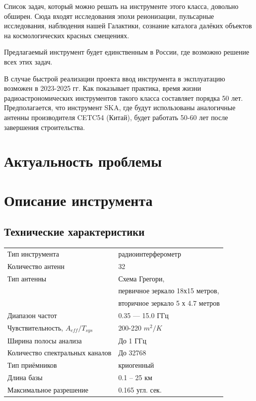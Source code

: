 \documentclass[10pt,a4paper]{article}
\begin{document}
Список задач, который можно решать на инструменте этого класса, довольно обширен. Сюда входят исследования эпохи реионизации, пульсарные исследования, наблюдения нашей Галактики, сознание каталога далёких объектов на космологических красных смещениях.

Предлагаемый инструмент будет единственным в России, где возможно решение всех этих задач.

В случае быстрой реализации проекта ввод инструмента в эксплуатацию возможен в 2023-2025 гг. Как показывает практика, время жизни радиоастрономических инструментов такого класса составляет порядка 50 лет. Предполагается, что инструмент SKA, где будут использованы аналогичные антенны производителя CETC54 (Китай), будет работать 50-60 лет после завершения строительства.

\section{Актуальность проблемы}

\section{Описание инструмента}

\subsection{ Технические характеристики}

\begin{minipage}{\linewidth}
\bigskip
\centering
{} \label{tab:rif32} 
\begin{tabular}{l|l}
  \hline
  Тип инструмента & радиоинтерферометр \\
  Количество антенн & 32 \\
  Тип антенны & Схема Грегори,\\ 
  & первичное зеркало 18х15 метров,\\ 
  & вторичное зеркало 5 х 4.7 метров \\
  Диапазон частот & 0.35 — 15.0 ГГц \\
  Чувствительность, $A_{eff}/T_{sys}$ & 200-220 $m^2/K$ \\
  Ширина полосы анализа &	До 1 ГГц \\
  Количество спектральных каналов & До 32768 \\
  Тип приёмников & криогенный \\
  Длина базы & 0.1 – 25 км \\
  Максимальное разрешение & 0.165 угл. сек.\\
  \hline
\end{tabular}
\bigskip
\end{minipage}
\end{document}

